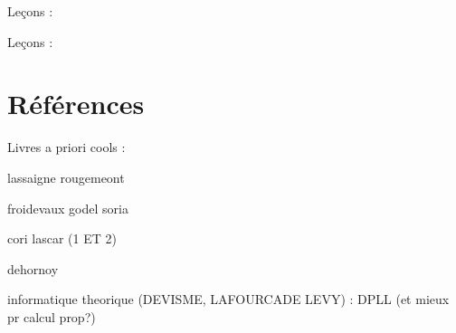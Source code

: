 \documentclass[../agregation.tex]{subfiles}
\begin{document}



Leçons :
\begin{itemize}
\end{itemize}

Leçons :
\begin{itemize}
\end{itemize}



\chapter{Références}

Livres a priori cools : \textcite{Kozen:1992:DAA:121450}

\printbibliography[segment=1,resetnumbers]

lassaigne rougemeont

froidevaux godel soria

cori lascar (1 ET 2)

dehornoy

informatique theorique (DEVISME, LAFOURCADE LEVY) : DPLL (et mieux pr calcul prop?)
\end{document}
